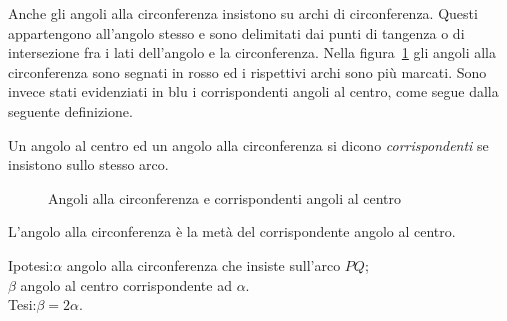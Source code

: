Anche gli angoli alla circonferenza insistono su archi di circonferenza. Questi appartengono all'angolo stesso e sono delimitati dai punti di tangenza o di intersezione fra i lati dell'angolo e la circonferenza. Nella figura~\ref{fig:ang_circonf} gli angoli alla circonferenza sono segnati in rosso ed i rispettivi archi sono più marcati. Sono invece stati evidenziati in blu i corrispondenti angoli al centro, come segue dalla seguente definizione.

\begin{definizione}
Un angolo al centro ed un angolo alla circonferenza si dicono \emph{corrispondenti} se insistono sullo stesso arco.
\end{definizione}

\begin{figure}[htb]\label{fig:ang_circonf}
	\centering
	\caption{Angoli alla circonferenza e corrispondenti angoli al centro}
\end{figure}

\pagebreak

\begin{teorema}
L'angolo alla circonferenza è la metà del corrispondente angolo al centro.
\end{teorema}

\noindent Ipotesi:\tab $\alpha$ angolo alla circonferenza che insiste sull'arco $PQ$;\\
\tab\tab $\beta$ angolo al centro corrispondente ad $\alpha$.\vspace{4pt}\\
Tesi:\tab $\beta = 2\alpha$.


